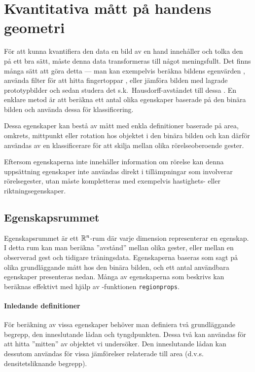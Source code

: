 \documentclass[../rapport_MVEX01-11-05]{subfiles}
\begin{document}
\section{Kvantitativa mått på handens geometri}\label{sec:features}
För att kunna kvantifiera den data en bild av en hand 
innehåller och tolka den på ett bra sätt, måste denna data transformeras till
något meningsfullt. Det finns många sätt att göra detta --- man kan exempelvis
beräkna bildens egenvärden \cite{Funck02}, använda filter för att hitta
fingertoppar \cite{Noelker97}, eller jämföra bilden med lagrade prototypbilder
och sedan studera det s.k.~Hausdorff-avståndet till dessa \cite{Nielsen04}.
En enklare metod
är att beräkna ett antal olika egenskaper baserade på den binära bilden
och använda dessa för klassificering.

Dessa egenskaper kan bestå av mått med enkla definitioner baserade på area,
omkrets, mittpunkt eller rotation hos objektet i den binära bilden och kan
därför användas av en klassificerare för att skilja mellan olika rörelseoberoende
gester.

Eftersom egenskaperna inte innehåller information om rörelse kan denna
uppsättning egenskaper inte användas direkt i tillämpningar som involverar
rörelsegester, utan måste kompletteras med exempelvis hastighets- eller
riktningsegenskaper.

\subsection{Egenskapsrummet}
Egenskapsrummet är ett $\mathbb{R}^n$-rum där varje dimension representerar en
egenskap. I detta rum kan man beräkna ''avstånd'' mellan olika gester,
eller mellan en observerad gest och tidigare träningsdata. Egenskaperna baseras som sagt
på olika grundläggande mått hos den binära bilden, och ett antal användbara
egenskaper presenteras nedan.
Många av egenskaperna som beskrivs kan beräknas effektivt med hjälp av
\MATLAB-funktionen \texttt{regionprops}.


\paragraph{Inledande definitioner}
För beräkning av vissa egenskaper behöver man definiera två
grundläggande begrepp, den inneslutande lådan och tyngdpunkten. Dessa
två kan användas för att hitta ''mitten'' av objektet
vi undersöker. Den inneslutande lådan kan dessutom användas för vissa
jämförelser relaterade till area (d.v.s. densitetsliknande begrepp).
\end{document}
